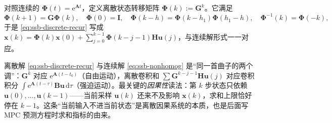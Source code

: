 \begin{definition}[离散状态转移矩阵]\label{def:ssb-discrete-stm}
对照连续的 $\boldsymbol{\Phi}(t)=\mathrm{e}^{\mathbf{A}t}$，定义离散状态转移矩阵 $\boldsymbol{\Phi}(k):=\mathbf{G}^k$。它满足
\begin{equation}
  \boldsymbol{\Phi}(k{+}1)=\mathbf{G}\boldsymbol{\Phi}(k),\quad \boldsymbol{\Phi}(0)=\mathbf{I},\quad
  \boldsymbol{\Phi}(k-h)=\boldsymbol{\Phi}(k-h_1)\boldsymbol{\Phi}(h_1-h),\quad \boldsymbol{\Phi}^{-1}(k)=\boldsymbol{\Phi}(-k),
  \label{eq:ssb-discrete-stm}
\end{equation}
于是 \cref{eq:ssb-discrete-recur} 写成 $\mathbf{x}(k)=\boldsymbol{\Phi}(k)\mathbf{x}(0)+\sum_{j=0}^{k-1}\boldsymbol{\Phi}(k-j-1)\mathbf{H}\mathbf{u}(j)$，与连续解形式一一对应。
\end{definition}

\begin{insight}
离散解 \cref{eq:ssb-discrete-recur} 与连续解 \cref{eq:ssb-nonhomog} 是“同一首曲子的两个调”：$\mathbf{G}^k$ 对应 $\mathrm{e}^{\mathbf{A}(t-t_0)}$（自由运动），离散卷积和 $\sum\mathbf{G}^{k-j-1}\mathbf{H}\mathbf{u}(j)$ 对应卷积积分 $\int\mathrm{e}^{\mathbf{A}(t-\tau)}\mathbf{B}\mathbf{u}\,\mathrm{d}\tau$（强迫运动）。最关键的\emph{因果性}读法：第 $k$ 步状态只依赖 $\mathbf{u}(0),\dots,\mathbf{u}(k-1)$——当前采样 $\mathbf{u}(k)$ 还来不及影响 $\mathbf{x}(k)$，求和上限恰好停在 $k-1$。这条“当前输入不进当前状态”是离散因果系统的本质，也是后面写 MPC 预测方程时求和指标的由来。
\end{insight}


